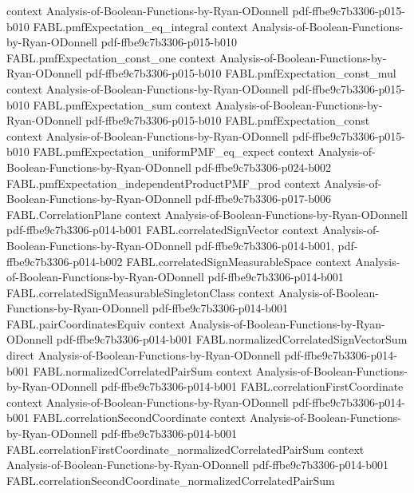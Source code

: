 \begin{theorem}
  {context}
  {Analysis-of-Boolean-Functions-by-Ryan-ODonnell}
  {pdf-ffbe9c7b3306-p015-b010}
\proofstep
  {FABL.pmfExpectation_eq_integral}
  {context}
  {Analysis-of-Boolean-Functions-by-Ryan-ODonnell}
  {pdf-ffbe9c7b3306-p015-b010}
\proofstep
  {FABL.pmfExpectation_const_one}
  {context}
  {Analysis-of-Boolean-Functions-by-Ryan-ODonnell}
  {pdf-ffbe9c7b3306-p015-b010}
\proofstep
  {FABL.pmfExpectation_const_mul}
  {context}
  {Analysis-of-Boolean-Functions-by-Ryan-ODonnell}
  {pdf-ffbe9c7b3306-p015-b010}
\proofstep
  {FABL.pmfExpectation_sum}
  {context}
  {Analysis-of-Boolean-Functions-by-Ryan-ODonnell}
  {pdf-ffbe9c7b3306-p015-b010}
\proofstep
  {FABL.pmfExpectation_const}
  {context}
  {Analysis-of-Boolean-Functions-by-Ryan-ODonnell}
  {pdf-ffbe9c7b3306-p015-b010}
\proofstep
  {FABL.pmfExpectation_uniformPMF_eq_expect}
  {context}
  {Analysis-of-Boolean-Functions-by-Ryan-ODonnell}
  {pdf-ffbe9c7b3306-p024-b002}
\proofstep
  {FABL.pmfExpectation_independentProductPMF_prod}
  {context}
  {Analysis-of-Boolean-Functions-by-Ryan-ODonnell}
  {pdf-ffbe9c7b3306-p017-b006}
\proofstep
  {FABL.CorrelationPlane}
  {context}
  {Analysis-of-Boolean-Functions-by-Ryan-ODonnell}
  {pdf-ffbe9c7b3306-p014-b001}
\proofstep
  {FABL.correlatedSignVector}
  {context}
  {Analysis-of-Boolean-Functions-by-Ryan-ODonnell}
  {pdf-ffbe9c7b3306-p014-b001,
    pdf-ffbe9c7b3306-p014-b002}
\proofstep
  {FABL.correlatedSignMeasurableSpace}
  {context}
  {Analysis-of-Boolean-Functions-by-Ryan-ODonnell}
  {pdf-ffbe9c7b3306-p014-b001}
\proofstep
  {FABL.correlatedSignMeasurableSingletonClass}
  {context}
  {Analysis-of-Boolean-Functions-by-Ryan-ODonnell}
  {pdf-ffbe9c7b3306-p014-b001}
\proofstep
  {FABL.pairCoordinatesEquiv}
  {context}
  {Analysis-of-Boolean-Functions-by-Ryan-ODonnell}
  {pdf-ffbe9c7b3306-p014-b001}
\proofstep
  {FABL.normalizedCorrelatedSignVectorSum}
  {direct}
  {Analysis-of-Boolean-Functions-by-Ryan-ODonnell}
  {pdf-ffbe9c7b3306-p014-b001}
\proofstep
  {FABL.normalizedCorrelatedPairSum}
  {context}
  {Analysis-of-Boolean-Functions-by-Ryan-ODonnell}
  {pdf-ffbe9c7b3306-p014-b001}
\proofstep
  {FABL.correlationFirstCoordinate}
  {context}
  {Analysis-of-Boolean-Functions-by-Ryan-ODonnell}
  {pdf-ffbe9c7b3306-p014-b001}
\proofstep
  {FABL.correlationSecondCoordinate}
  {context}
  {Analysis-of-Boolean-Functions-by-Ryan-ODonnell}
  {pdf-ffbe9c7b3306-p014-b001}
\proofstep
  {FABL.correlationFirstCoordinate_normalizedCorrelatedPairSum}
  {context}
  {Analysis-of-Boolean-Functions-by-Ryan-ODonnell}
  {pdf-ffbe9c7b3306-p014-b001}
\proofstep
  {FABL.correlationSecondCoordinate_normalizedCorrelatedPairSum}

\end{theorem}
